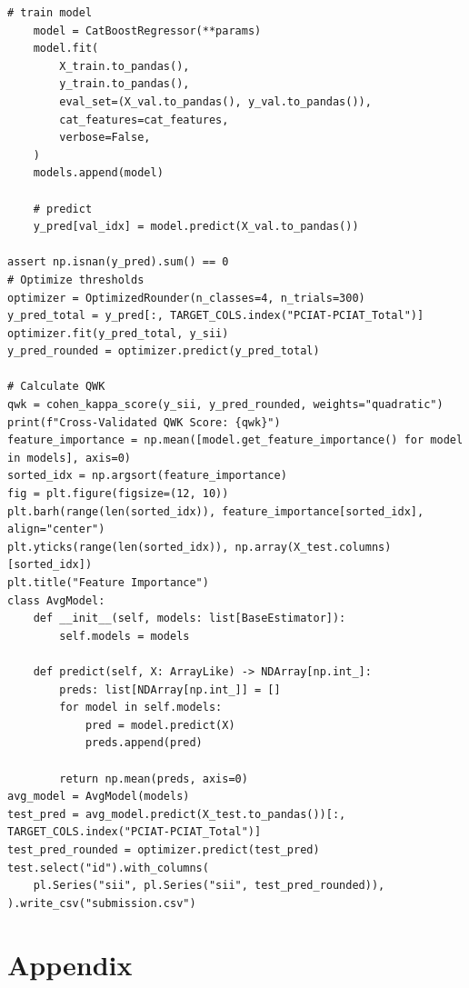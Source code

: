 \documentclass[11pt]{extarticle}
\begin{document}
\begin{mdframed}
\begin{lstlisting}[breaklines=true]
    # train model
    model = CatBoostRegressor(**params)
    model.fit(
        X_train.to_pandas(),
        y_train.to_pandas(),
        eval_set=(X_val.to_pandas(), y_val.to_pandas()),
        cat_features=cat_features,
        verbose=False,
    )
    models.append(model)

    # predict
    y_pred[val_idx] = model.predict(X_val.to_pandas())

assert np.isnan(y_pred).sum() == 0
# Optimize thresholds
optimizer = OptimizedRounder(n_classes=4, n_trials=300)
y_pred_total = y_pred[:, TARGET_COLS.index("PCIAT-PCIAT_Total")]
optimizer.fit(y_pred_total, y_sii)
y_pred_rounded = optimizer.predict(y_pred_total)

# Calculate QWK
qwk = cohen_kappa_score(y_sii, y_pred_rounded, weights="quadratic")
print(f"Cross-Validated QWK Score: {qwk}")
feature_importance = np.mean([model.get_feature_importance() for model in models], axis=0)
sorted_idx = np.argsort(feature_importance)
fig = plt.figure(figsize=(12, 10))
plt.barh(range(len(sorted_idx)), feature_importance[sorted_idx], align="center")
plt.yticks(range(len(sorted_idx)), np.array(X_test.columns)[sorted_idx])
plt.title("Feature Importance")
class AvgModel:
    def __init__(self, models: list[BaseEstimator]):
        self.models = models

    def predict(self, X: ArrayLike) -> NDArray[np.int_]:
        preds: list[NDArray[np.int_]] = []
        for model in self.models:
            pred = model.predict(X)
            preds.append(pred)

        return np.mean(preds, axis=0)
avg_model = AvgModel(models)
test_pred = avg_model.predict(X_test.to_pandas())[:, TARGET_COLS.index("PCIAT-PCIAT_Total")]
test_pred_rounded = optimizer.predict(test_pred)
test.select("id").with_columns(
    pl.Series("sii", pl.Series("sii", test_pred_rounded)),
).write_csv("submission.csv")
\end{lstlisting}
\end{mdframed}
\section{Appendix}
\end{document}
